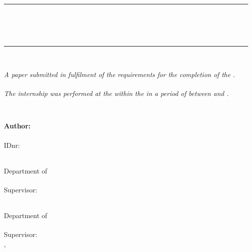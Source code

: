 \thispagestyle{empty}

\begin{center}
\textsc{\Large \myUni}\\[1.5cm]
\rule{\linewidth}{0.5mm} \\[0.4cm]
{ \huge \sffamily \bfseries \myTitle}\\[0.4cm]
{ \large \mySubtitle}\\[0.4cm]
\rule{\linewidth}{0.5mm} \\[2cm]

\begin{minipage}[b]{0.76 \textwidth}
\textit{A paper submitted in fulfilment of the requirements for the completion of the \myProject. \\ \\The internship was performed at the \myOtherUni within the \myOtherGroup in a period of \myDuration  between \myStartDate and \myEndDate.}
\end{minipage} \\[2cm]

\end{center}

\begin{flushleft}
\textbf{\sffamily Author:}\\
\myName \\
IDnr:\quad \myID \\

\vspace*{\baselineskip}

\textbf{\sffamily\myOtherUni}\\
Department of \myOtherFaculty \\
\myOtherGroup \\
Supervisor: \myOtherSupervisor \\

\vspace*{\baselineskip}

\textbf{\sffamily\myUni}\\
Department of \myFaculty \\
\myGroup \\
Supervisor: \mySupervisor \\

\vfill
\myLocation, \myTime

\end{flushleft}
\cleardoublepage